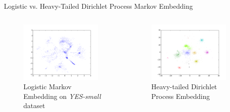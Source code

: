 \documentclass{beamer}
\begin{document}
\begin{frame}{Logistic vs. Heavy-Tailed Dirichlet Process Markov Embedding}
\begin{columns}[c]
\column{5.5cm}
\begin{figure}
  \caption{Logistic Markov Embedding on \emph{YES-small} dataset \cite{LME}}
    \includegraphics[width=0.95\textwidth]{LME.png}
\end{figure}
\column{5.5cm}
\pause
\begin{figure}
  \caption{Heavy-tailed Dirichlet Process Embedding}
  \vspace{15px}
    \includegraphics[trim=0mm 2mm 0mm 0mm, width=0.95\textwidth]{ProbEmbed.png}
\end{figure}
\end{columns}
\end{frame}
\end{document}
